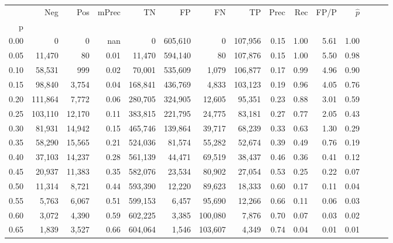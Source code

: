 \begin{tabular}{rrrrrrrrrrrrrrr}
\toprule
{} &      Neg &     Pos & mPrec &       TN &       FP &       FN &       TP &  Prec &   Rec &  FP/P & $\hat{p}$ \\
p    &          &         &       &          &          &          &          &       &       &       &           \\
\midrule
0.00 &        0 &       0 &   nan &        0 &  605,610 &        0 &  107,956 &  0.15 &  1.00 &  5.61 &      1.00 \\
0.05 &   11,470 &      80 &  0.01 &   11,470 &  594,140 &       80 &  107,876 &  0.15 &  1.00 &  5.50 &      0.98 \\
0.10 &   58,531 &     999 &  0.02 &   70,001 &  535,609 &    1,079 &  106,877 &  0.17 &  0.99 &  4.96 &      0.90 \\
0.15 &   98,840 &   3,754 &  0.04 &  168,841 &  436,769 &    4,833 &  103,123 &  0.19 &  0.96 &  4.05 &      0.76 \\
0.20 &  111,864 &   7,772 &  0.06 &  280,705 &  324,905 &   12,605 &   95,351 &  0.23 &  0.88 &  3.01 &      0.59 \\
0.25 &  103,110 &  12,170 &  0.11 &  383,815 &  221,795 &   24,775 &   83,181 &  0.27 &  0.77 &  2.05 &      0.43 \\
0.30 &   81,931 &  14,942 &  0.15 &  465,746 &  139,864 &   39,717 &   68,239 &  0.33 &  0.63 &  1.30 &      0.29 \\
0.35 &   58,290 &  15,565 &  0.21 &  524,036 &   81,574 &   55,282 &   52,674 &  0.39 &  0.49 &  0.76 &      0.19 \\
0.40 &   37,103 &  14,237 &  0.28 &  561,139 &   44,471 &   69,519 &   38,437 &  0.46 &  0.36 &  0.41 &      0.12 \\
0.45 &   20,937 &  11,383 &  0.35 &  582,076 &   23,534 &   80,902 &   27,054 &  0.53 &  0.25 &  0.22 &      0.07 \\
0.50 &   11,314 &   8,721 &  0.44 &  593,390 &   12,220 &   89,623 &   18,333 &  0.60 &  0.17 &  0.11 &      0.04 \\
0.55 &    5,763 &   6,067 &  0.51 &  599,153 &    6,457 &   95,690 &   12,266 &  0.66 &  0.11 &  0.06 &      0.03 \\
0.60 &    3,072 &   4,390 &  0.59 &  602,225 &    3,385 &  100,080 &    7,876 &  0.70 &  0.07 &  0.03 &      0.02 \\
0.65 &    1,839 &   3,527 &  0.66 &  604,064 &    1,546 &  103,607 &    4,349 &  0.74 &  0.04 &  0.01 &      0.01 \\

\end{tabular}
